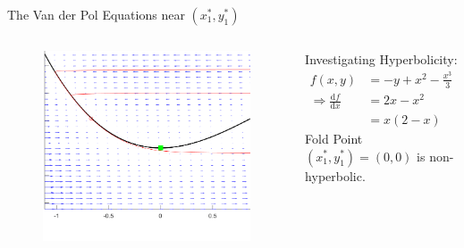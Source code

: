 \documentclass[11pt]{beamer}
\newcommand{\dif}{\mathrm{d}}
\begin{document}
\begin{frame}{The Van der Pol Equations near $(x_1^*,y_1^*)$ }
\begin{columns}
\begin{figure}[h!]
    \centering
    \includegraphics[width=\textwidth]{PPlanecrop.png}
\end{figure}


Investigating Hyperbolicity:
\begin{align*}
f(x,y)&= -y + x^2 - \frac{x^3}{3}\\
\Rightarrow \frac{\dif f}{\dif x}&= 2x -x^2 \\
&= x(2-x)
\end{align*}
\newline
\newline
Fold Point $(x_1^*,y_1^*)= (0,0) $ is non-hyperbolic.
\end{columns}
\end{frame}




%
%
	
\end{document}

